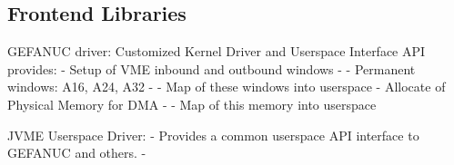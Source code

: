 \subsection{Frontend Libraries}

GEFANUC driver:
  Customized Kernel Driver and Userspace Interface
  API provides:
  - Setup of VME inbound and outbound windows
  - - Permanent windows: A16, A24, A32
  - - Map of these windows into userspace
  - Allocate of Physical Memory for DMA
  - - Map of this memory into userspace

JVME Userspace Driver:
  - Provides a common userspace API interface to GEFANUC and others.
  -
